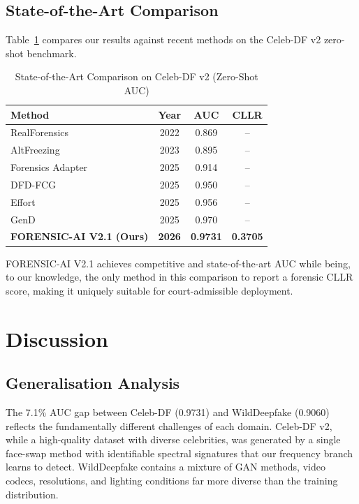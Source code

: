 \documentclass[journal]{IEEEtran}
\begin{document}
\subsection{State-of-the-Art Comparison}
Table~\ref{tab:sota} compares our results against recent methods on the Celeb-DF v2 zero-shot benchmark.

\begin{table}[!t]
\renewcommand{\arraystretch}{1.3}
\caption{State-of-the-Art Comparison on Celeb-DF v2 (Zero-Shot AUC)}
\label{tab:sota}
\centering
\begin{tabular}{lccc}
\toprule
\textbf{Method} & \textbf{Year} & \textbf{AUC} & \textbf{CLLR} \\
\midrule
RealForensics \cite{Rossler2019}      & 2022 & 0.869 & -- \\
AltFreezing \cite{Wang2023}           & 2023 & 0.895 & -- \\
Forensics Adapter \cite{Cui2025}      & 2025 & 0.914 & -- \\
DFD-FCG \cite{Han2025}                & 2025 & 0.950 & -- \\
Effort \cite{effort2025}              & 2025 & 0.956 & -- \\
GenD \cite{Yermakov2025}              & 2025 & 0.970 & -- \\
\textbf{FORENSIC-AI V2.1 (Ours)}      & \textbf{2026} & \textbf{0.9731} & \textbf{0.3705} \\
\bottomrule
\end{tabular}
\end{table}

FORENSIC-AI V2.1 achieves competitive and state-of-the-art AUC while being, to our knowledge, the only method in this comparison to report a forensic CLLR score, making it uniquely suitable for court-admissible deployment.

\section{Discussion}
\label{sec:discussion}

\subsection{Generalisation Analysis}
The 7.1\% AUC gap between Celeb-DF (0.9731) and WildDeepfake (0.9060) reflects the fundamentally different challenges of each domain. Celeb-DF v2, while a high-quality dataset with diverse celebrities, was generated by a single face-swap method with identifiable spectral signatures that our frequency branch learns to detect. WildDeepfake contains a mixture of GAN methods, video codecs, resolutions, and lighting conditions far more diverse than the training distribution.
\end{document}
